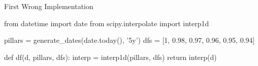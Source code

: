 \documentclass{beamer}
\begin{document}
%	
%	
%
%			

\begin{frame}[fragile]{First Wrong Implementation}

\begin{ipython}
from datetime import date
from scipy.interpolate import interp1d 

pillars = generate_dates(date.today(), '5y')
dfs = [1, 0.98, 0.97, 0.96, 0.95, 0.94]

def df(d, pillars, dfs):
  interp = interp1d(pillars, dfs)
  return interp(d)
\end{ipython}

\end{frame}		
\end{document}
